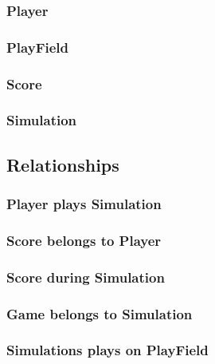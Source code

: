 \documentclass[fontsize=12pt,
               paper=a4,
               twoside=false,
               parskip=half,
               ]{scrartcl}
\begin{document}
\subsubsection{Player}

\subsubsection{PlayField}

\subsubsection{Score}

\subsubsection{Simulation}




\subsection{Relationships}

\subsubsection{Player plays Simulation}

\subsubsection{Score belongs to Player}

\subsubsection{Score during Simulation}

\subsubsection{Game belongs to Simulation}

\subsubsection{Simulations plays on PlayField}
\end{document}
